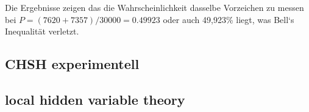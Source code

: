 Die Ergebnisse zeigen das die Wahrscheinlichkeit dasselbe Vorzeichen zu messen bei $P = (7620 + 7357) / 30000 = 0.49923$ oder auch 49,923\% liegt, was Bell`s Inequalität verletzt.\\


\subsection{CHSH experimentell}
\label{subsec:chsh_experimentell}


\subsection{local hidden variable theory}
\label{subsec:chsh_lhvt}